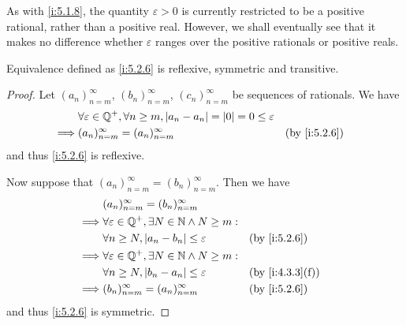 \begin{rmk}\label{i:5.2.7}
  As with \cref{i:5.1.8}, the quantity \(\varepsilon > 0\) is currently restricted to be a positive rational, rather than a positive real.
  However, we shall eventually see that it makes no difference whether \(\varepsilon\) ranges over the positive rationals or positive reals.
\end{rmk}

\begin{ac}\label{i:ac:5.2.1}
  Equivalence defined as \cref{i:5.2.6} is reflexive, symmetric and transitive.
\end{ac}

\begin{proof}
  Let \((a_n)_{n = m}^\infty\), \((b_n)_{n = m}^\infty\), \((c_n)_{n = m}^\infty\) be sequences of rationals.
  We have
  \begin{align*}
             & \forall \varepsilon \in \Q^+, \forall n \geq m, \abs{a_n - a_n} = \abs{0} = 0 \leq \varepsilon                   \\
    \implies & (a_n)_{n = m}^\infty = (a_n)_{n = m}^\infty                                                    &  & \by{i:5.2.6}
  \end{align*}
  and thus \cref{i:5.2.6} is reflexive.

  Now suppose that \((a_n)_{n = m}^\infty = (b_n)_{n = m}^\infty\).
  Then we have
  \begin{align*}
             & (a_n)_{n = m}^\infty = (b_n)_{n = m}^\infty                                         \\
    \implies & \forall \varepsilon \in \Q^+, \exists N \in \N \land N \geq m:                      \\
             & \forall n \geq N, \abs{a_n - b_n} \leq \varepsilon             &  & \by{i:5.2.6}    \\
    \implies & \forall \varepsilon \in \Q^+, \exists N \in \N \land N \geq m:                      \\
             & \forall n \geq N, \abs{b_n - a_n} \leq \varepsilon             &  & \by{i:4.3.3}[f] \\
    \implies & (b_n)_{n = m}^\infty = (a_n)_{n = m}^\infty                    &  & \by{i:5.2.6}
  \end{align*}
  and thus \cref{i:5.2.6} is symmetric.


\end{proof}
